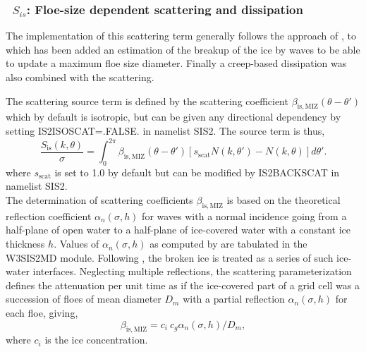 \vsssub
\subsubsection{~$S_{is}$: Floe-size dependent scattering and dissipation} \label{sec:IS2}
\vsssub



The implementation of this scattering term generally 
follows the approach of \cite{art:MM06}, to which has been added an estimation of the breakup of the ice 
by waves to be able to update a maximum floe size diameter. Finally a creep-based dissipation was also 
combined with the scattering.  


The scattering source term is defined by the scattering coefficient $\beta_{\mathrm{is},\mathrm{MIZ}}(\theta-\theta')$ which by default is isotropic, but can be given any directional dependency by setting {\code IS2ISOSCAT=.FALSE.} in namelist {\F SIS2}. The source term is thus,
\begin{equation}
 \frac{S_{\mathrm{is}}(k,\theta)}{\sigma} =  \int_0^{2\pi}\beta_{\mathrm{is},\mathrm{MIZ}}(\theta-\theta') [s_\mathrm{scat}  N(k,\theta')-N(k,\theta)] d\theta'  .
 \end{equation}
where $s_\mathrm{scat}$ is set to 1.0 by default but can be modified by 
{\code IS2BACKSCAT} in namelist {\F SIS2}. \\


The determination of scattering coefficients  $\beta_{\mathrm{is},\mathrm{MIZ}}$ is based on the theoretical 
reflection coefficient $\alpha_n(\sigma,h)$
for waves with a normal incidence going from a half-plane of open water to a half-plane of ice-covered water with a 
constant ice thickness $h$.  Values of $\alpha_n(\sigma,h)$ as computed by \cite{art:KM08} are tabulated 
in the {\code W3SIS2MD} module. Following \cite{art:Dea11}, the broken ice is treated as a series of 
such ice-water interfaces. Neglecting multiple reflections, the scattering parameterization defines the attenuation 
per unit time as if the ice-covered part of a grid cell was a succession of floes of mean diameter $D_{m}$ with a partial 
reflection $\alpha_n(\sigma,h)$ for each floe, giving, 
\begin{equation}
\beta_{\mathrm{is},\mathrm{MIZ}}=c_i~c_g \alpha_n(\sigma,h) / D_{m},
 \end{equation}
where $c_i$ is the ice concentration. \\
 

